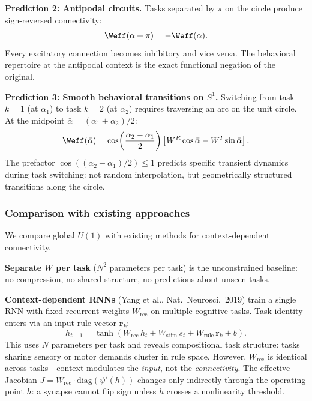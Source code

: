 \documentclass[11pt]{article}
\begin{document}
\textbf{Prediction 2: Antipodal circuits.}
Tasks separated by $\pi$ on the circle produce sign-reversed connectivity:
\begin{equation}
\Weff(\alpha + \pi) = -\Weff(\alpha).
\label{eq:antipodal}
\end{equation}
Every excitatory connection becomes inhibitory and vice versa. The behavioral repertoire at the antipodal context is the exact functional negation of the original.

\textbf{Prediction 3: Smooth behavioral transitions on $S^1$.}
Switching from task $k=1$ (at $\alpha_1$) to task $k=2$ (at $\alpha_2$) requires traversing an arc on the unit circle. At the midpoint $\bar{\alpha} = (\alpha_1 + \alpha_2)/2$:
\begin{equation}
\Weff(\bar{\alpha}) = \cos\!\left(\frac{\alpha_2 - \alpha_1}{2}\right)\left[W^R\cos\bar{\alpha} - W^I\sin\bar{\alpha}\right].
\label{eq:midpoint}
\end{equation}
The prefactor $\cos((\alpha_2-\alpha_1)/2) \leq 1$ predicts specific transient dynamics during task switching: not random interpolation, but geometrically structured transitions along the circle.

\subsubsection{Comparison with existing approaches}
\label{sec:comparison}

We compare global $U(1)$ with existing methods for context-dependent connectivity.

\textbf{Separate $W$ per task} ($N^2$ parameters per task) is the unconstrained baseline: no compression, no shared structure, no predictions about unseen tasks.

\textbf{Context-dependent RNNs} (Yang et al., Nat.\ Neurosci.\ 2019) train a single RNN with fixed recurrent weights $W_{\text{rec}}$ on multiple cognitive tasks. Task identity enters via an input rule vector $\mathbf{r}_k$:
\begin{equation}
h_{t+1} = \tanh(W_{\text{rec}}\, h_t + W_{\text{stim}}\, s_t + W_{\text{rule}}\, \mathbf{r}_k + b).
\end{equation}
This uses $N$ parameters per task and reveals compositional task structure: tasks sharing sensory or motor demands cluster in rule space. However, $W_{\text{rec}}$ is identical across tasks---context modulates the \emph{input}, not the \emph{connectivity}. The effective Jacobian $J = W_{\text{rec}} \cdot \text{diag}(\psi'(h))$ changes only indirectly through the operating point $h$: a synapse cannot flip sign unless $h$ crosses a nonlinearity threshold.
\end{document}
